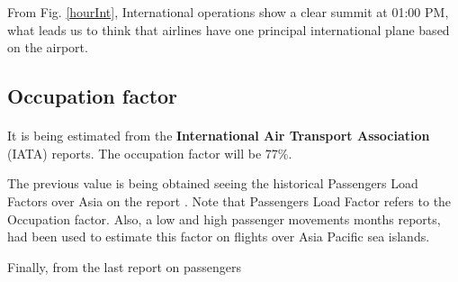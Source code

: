 From Fig. \ref{hourInt}, International operations show a clear summit at 01:00 PM, what leads us to think that airlines have one principal international plane based on the airport.
	\subsection{Occupation factor}
	\paragraph{} It is being estimated from the \textbf{International Air Transport Association} (IATA) reports. The occupation factor will be 77\%.
	
	The previous value is being obtained seeing the historical Passengers Load Factors over Asia on the report \cite{IATA_PLF}. Note that Passengers Load Factor refers to the Occupation factor. Also, a low \cite{IATA2} and high \cite{IATA_August} passenger movements months reports, had been used to estimate this factor on flights over Asia Pacific sea islands.
	
	Finally, from the last report on passengers 
	
	